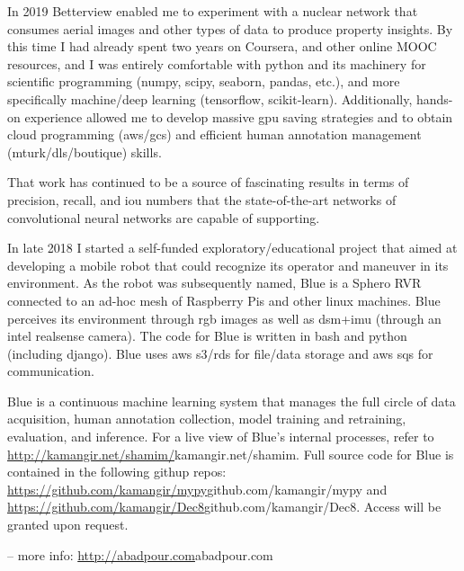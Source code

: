 \vspace{0.5cm}
In 2019 Betterview enabled me to experiment with a nuclear network that consumes aerial images and other types of data to produce property insights. By this time I had already spent two years on Coursera, and other online MOOC resources, and I was entirely comfortable with python and its machinery for scientific programming (numpy, scipy, seaborn, pandas, etc.), and more specifically machine/deep learning (tensorflow, scikit-learn). Additionally, hands-on experience allowed me to develop massive gpu saving strategies and to obtain cloud programming (aws/gcs) and efficient human annotation management (mturk/dls/boutique) skills. 

\vspace{0.5cm}
That work has continued to be a source of fascinating results in terms of precision, recall, and iou numbers that the state-of-the-art networks of convolutional neural networks are capable of supporting.

\vspace{0.5cm}
In late 2018 I started a self-funded exploratory/educational project that aimed at developing a mobile robot that could recognize its operator and maneuver in its environment. As the robot was subsequently named, Blue is a Sphero RVR connected to an ad-hoc mesh of Raspberry Pis and other linux machines. Blue perceives its environment through rgb images as well as dsm+imu (through an intel realsense camera). The code for Blue is written in bash and python (including django). Blue uses aws s3/rds for file/data storage and aws sqs for communication. 

\vspace{0.5cm}
Blue is a continuous machine learning system that manages the full circle of data acquisition, human annotation collection, model training and retraining, evaluation, and inference. For a live view of Blue's internal processes, refer to \url{http://kamangir.net/shamim/}{kamangir.net/shamim}. Full source code for Blue is contained in the following githup repos: \url{https://github.com/kamangir/mypy}{github.com/kamangir/mypy} and \url{https://github.com/kamangir/Dec8}{github.com/kamangir/Dec8}. Access will be granted upon request.

\vspace{0.5cm}
-- more info: \url{http://abadpour.com}{abadpour.com}

\vspace{1.5cm}
